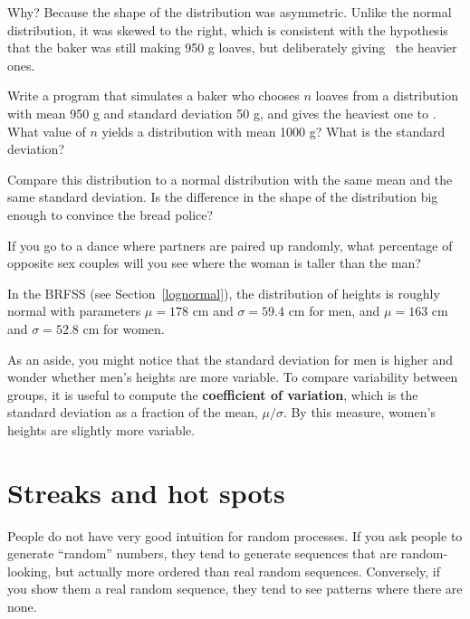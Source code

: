\documentclass[12pt]{book}
\begin{document}
Why?  Because the shape of the distribution was asymmetric.  Unlike
the normal distribution, it was skewed to the right, which is
consistent with the hypothesis that the baker was still making 950 g
loaves, but deliberately giving \Poincare~the heavier ones.


\begin{ex}

Write a program that simulates a baker who chooses $n$ loaves from a
distribution with mean 950 g and standard deviation 50 g, and gives
the heaviest one to \Poincare.  What value of $n$ yields a
distribution with mean 1000 g?  What is the standard deviation?

Compare this distribution to a normal distribution with the same mean
and the same standard deviation.  Is the difference in the shape of
the distribution big enough to convince the bread police?

\end{ex}


\begin{ex}

If you go to a dance where partners are paired up randomly, what
percentage of opposite sex couples will you see where the woman is
taller than the man?

In the BRFSS (see Section~\ref{lognormal}), the distribution of
heights is roughly normal with parameters $\mu=178$ cm and
$\sigma=59.4$ cm for men, and $\mu=163$ cm and $\sigma=52.8$ cm for
women.

As an aside, you might notice that the standard deviation for men is
higher and wonder whether men's heights are more variable.  To compare
variability between groups, it is useful to compute the {\bf
  coefficient of variation}, which is the standard deviation as a
fraction of the mean, $\mu / \sigma$.  By this measure, women's
heights are slightly more variable.


\end{ex}


\section{Streaks and hot spots}

People do not have very good intuition for random processes.  If you
ask people to generate ``random'' numbers, they tend to generate
sequences that are random-looking, but actually more ordered than real
random sequences.  Conversely, if you show them a real random
sequence, they tend to see patterns where there are none.
\end{document}
